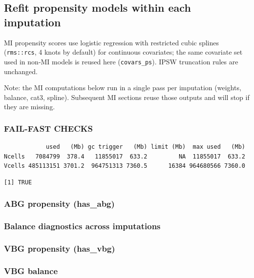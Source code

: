 \documentclass[
  11pt,
  letterpaper,
  DIV=11,
  numbers=noendperiod]{scrartcl}
\begin{document}
\subsection{Refit propensity models within each
imputation}\label{refit-propensity-models-within-each-imputation}

MI propensity scores use logistic regression with restricted cubic
splines (\texttt{rms::rcs}, 4 knots by default) for continuous
covariates; the same covariate set used in non‑MI models is reused here
(\texttt{covars\_ps}). IPSW truncation rules are unchanged.

Note: the MI computations below run in a single pass per imputation
(weights, balance, cat3, spline). Subsequent MI sections reuse those
outputs and will stop if they are missing.

\subsubsection{FAIL-FAST CHECKS}\label{fail-fast-checks}

\begin{verbatim}
            used   (Mb) gc trigger   (Mb) limit (Mb)  max used   (Mb)
Ncells   7084799  378.4   11855017  633.2         NA  11855017  633.2
Vcells 485113151 3701.2  964751313 7360.5      16384 964680566 7360.0
\end{verbatim}

\begin{verbatim}
[1] TRUE
\end{verbatim}

\subsubsection{ABG propensity (has\_abg)}\label{abg-propensity-has_abg}

\subsubsection{Balance diagnostics across
imputations}\label{balance-diagnostics-across-imputations}

\subsubsection{VBG propensity (has\_vbg)}\label{vbg-propensity-has_vbg}

\subsubsection{VBG balance}\label{vbg-balance}
\end{document}
